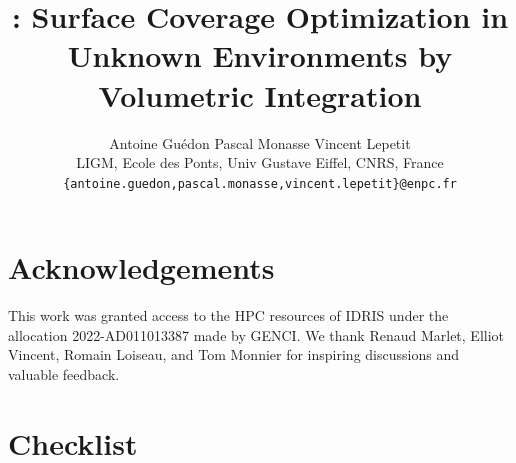 \documentclass{article}
\title{\method: Surface Coverage Optimization in Unknown Environments by Volumetric Integration}
\author{%
  Antoine Guédon \qquad Pascal Monasse \qquad Vincent Lepetit %
  \\
  LIGM, Ecole des Ponts, Univ Gustave Eiffel, CNRS, France \\
  \texttt{\{antoine.guedon,pascal.monasse,vincent.lepetit\}@enpc.fr} \\
}
\begin{document}
\maketitle











\section*{Acknowledgements}

This work was granted access to the HPC resources of IDRIS under the allocation 2022-AD011013387 made by GENCI. We thank Renaud Marlet, Elliot Vincent, Romain Loiseau, and Tom Monnier for inspiring discussions and valuable feedback.




\section*{Checklist}


\end{document}
